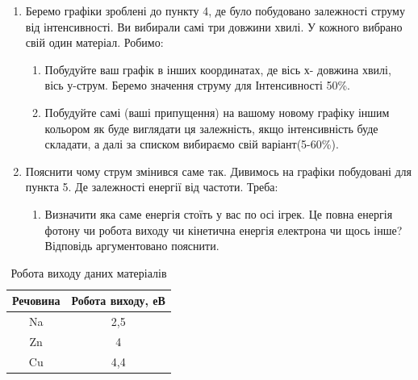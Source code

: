 \documentclass[a4paper,14pt]{extreport}
\begin{document}
\begin{enumerate}
		\item Беремо  графіки зроблені до пункту 4, де було побудовано залежності струму від інтенсивності. Ви вибирали самі три довжини хвилі. У кожного вибрано свій один матеріал. Робимо:
		\begin{enumerate}[label=2.\arabic*]
			\item Побудуйте ваш графік в інших координатах, де вісь х- довжина хвилі, вісь у-струм. Беремо значення струму для Інтенсивності 50\%.
			\item Побудуйте самі (ваші припущення) на вашому новому графіку іншим кольором як буде виглядати ця залежність, якщо інтенсивність буде складати, а далі за списком вибираємо свій варіант(5-60\%).
		\end{enumerate}
		\item Пояснити чому струм змінився саме так. Дивимось на графіки побудовані для пункта 5. Де залежності енергії від частоти. Треба:
		\begin{enumerate}[label=3.\arabic*]
			\item Визначити яка саме енергія стоїть у вас по осі ігрек. Це повна енергія фотону чи робота виходу чи кінетична енергія електрона чи щось інше? Відповідь аргументовано пояснити.
		\end{enumerate}
\end{enumerate}
\newpage
\begin{center}\textbf{}\end{center}\par
	
		\begin{table}[h!]
		\begin{center}
		\caption{Робота виходу даних матеріалів}
			\begin{tabular}{|c|c|}
			\hline
			\textbf{Речовина} & \textbf{Робота виходу, еВ} \\ \hline
			Na                & 2,5                        \\ \hline
			Zn                & 4                          \\ \hline
			Cu                & 4,4                        \\ \hline
			\end{tabular}
			\label{1.2-1.3}
		\end{center}
	\end{table}
\end{document}
